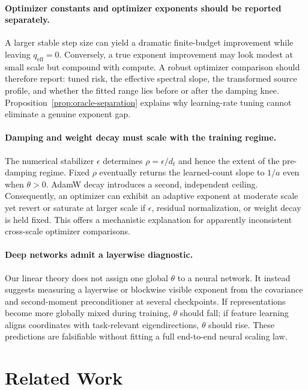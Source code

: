\documentclass[letterpaper]{article} %
\newcommand{\qeff}{q_{\mathrm{eff}}}
\begin{document}
\paragraph{Optimizer constants and optimizer exponents should be reported separately.}
A larger stable step size can yield a dramatic finite-budget improvement while leaving $\qeff=0$.  Conversely, a true exponent improvement may look modest at small scale but compound with compute.  A robust optimizer comparison should therefore report: tuned risk, the effective spectral slope, the transformed source profile, and whether the fitted range lies before or after the damping knee.  Proposition~\ref{prop:oracle-separation} explains why learning-rate tuning cannot eliminate a genuine exponent gap.

\paragraph{Damping and weight decay must scale with the training regime.}
The numerical stabilizer $\epsilon$ determines $\rho=\epsilon/d_t$ and hence the extent of the pre-damping regime.  Fixed $\rho$ eventually returns the learned-count slope to $1/a$ even when $\theta>0$.  AdamW decay introduces a second, independent ceiling.  Consequently, an optimizer can exhibit an adaptive exponent at moderate scale yet revert or saturate at larger scale if $\epsilon$, residual normalization, or weight decay is held fixed.  This offers a mechanistic explanation for apparently inconsistent cross-scale optimizer comparisons.

\paragraph{Deep networks admit a layerwise diagnostic.}
Our linear theory does not assign one global $\theta$ to a neural network.  It instead suggests measuring a layerwise or blockwise visible exponent from the covariance and second-moment preconditioner at several checkpoints.  If representations become more globally mixed during training, $\theta$ should fall; if feature learning aligns coordinates with task-relevant eigendirections, $\theta$ should rise.  These predictions are falsifiable without fitting a full end-to-end neural scaling law.


\section{Related Work}
\end{document}
